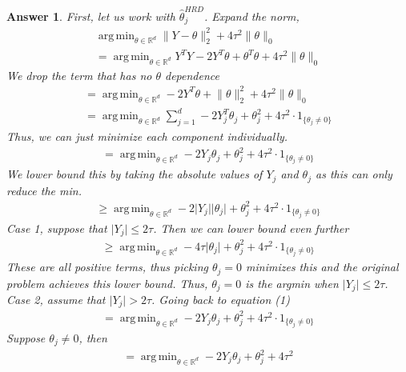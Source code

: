 \documentclass[12pt]{article}
\DeclareMathOperator*{\argmin}{arg\,min}
\theoremstyle{colon}
\newtheorem*{answer}{Answer}
\begin{document}
\begin{answer}
  First, let us work with $\hat{\theta}_j^{HRD}$. Expand the norm,
  \begin{gather*}
    \argmin_{\theta \in \mathbb{R}^d} \lVert Y - \theta \rVert_2^2 + 4 \tau^2 \lVert \theta \rVert_0 \\
    = \argmin_{\theta \in \mathbb{R}^d} Y^T Y - 2 Y^T \theta + \theta^T \theta + 4 \tau^2 \lVert \theta \rVert_0
  \end{gather*}
  We drop the term that has no $\theta$ dependence
  \begin{gather*}
    = \argmin_{\theta \in \mathbb{R}^d} - 2 Y^T \theta + \lVert \theta \rVert_2^2 + 4 \tau^2 \lVert \theta \rVert_0 \\
    = \argmin_{\theta \in \mathbb{R}^d} \sum_{j=1}^d - 2 Y_j^T \theta_j + \theta_j^2 + 4 \tau^2 \cdot 1_{\{\theta_j \neq 0\}}
  \end{gather*}
  Thus, we can just minimize each component individually.
  \begin{gather}
    = \argmin_{\theta \in \mathbb{R}^d} - 2 Y_j \theta_j + \theta_j^2 + 4 \tau^2 \cdot 1_{\{\theta_j \neq 0\}}
  \end{gather}
  We lower bound this by taking the absolute values of $Y_j$ and $\theta_j$ as this can only reduce the min.
  \begin{gather*}
    \geq \argmin_{\theta \in \mathbb{R}^d} - 2 \lvert Y_j \rvert \lvert \theta_j \rvert + \theta_j^2 + 4 \tau^2 \cdot 1_{\{\theta_j \neq 0\}}
  \end{gather*}
  Case 1, suppose that $\lvert Y_j \rvert \leq 2 \tau$. Then we can lower bound even further
  \begin{gather*}
    \geq \argmin_{\theta \in \mathbb{R}^d} - 4 \tau \lvert \theta_j \rvert + \theta_j^2 + 4 \tau^2 \cdot 1_{\{\theta_j \neq 0\}}
  \end{gather*}
  These are all positive terms, thus picking $\theta_j = 0$ minimizes this and the original problem achieves this lower bound. Thus, $\theta_j = 0$ is the argmin when $\lvert Y_j \rvert \leq 2 \tau$. Case 2, assume that $\lvert Y_j \rvert > 2 \tau$. Going back to equation (1)
  \begin{gather*}
    = \argmin_{\theta \in \mathbb{R}^d} - 2 Y_j \theta_j + \theta_j^2 + 4 \tau^2 \cdot 1_{\{\theta_j \neq 0\}}
  \end{gather*}
  Suppose $\theta_j \neq 0$, then
  \begin{gather*}
    = \argmin_{\theta \in \mathbb{R}^d} - 2 Y_j \theta_j + \theta_j^2 + 4 \tau^2

\end{gather*}
\end{answer}
\end{document}
